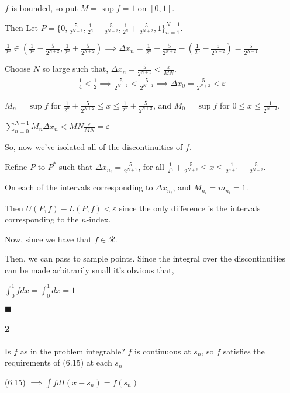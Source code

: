 \documentclass{article}
\begin{document}
$f$ is bounded, so put $M = \sup f = 1$ on $[0,1]$.

Then Let $P = \{0,\frac{5}{2^{N+2}},\frac{1}{2^n}- \frac{5}{2^{N+2}},
\frac{1}{2^n}+ \frac{5}{2^{N+2}}, 1\}_{n=1}^{N-1}$.

$\frac{1}{2^n} \in \left(\frac{1}{2^n}- \frac{5}{2^{N+2}},
\frac{1}{2^n}+ \frac{5}{2^{N+2}}\right) \implies \varDelta x_n =
\frac{1}{2^n}+ \frac{5}{2^{N+2}} -\left(\frac{1}{2^n}-
  \frac{5}{2^{N+2}}\right) = \frac{5}{2^{N+1}}$


Choose $N$ so large such that, $\varDelta x_n = \frac{5}{2^{N+1}} <
\frac{\varepsilon}{MN}$.
\begin{align*}
\frac{1}{4} < \frac{1}{2} \implies \frac{5}{2^{N+2}} <
  \frac{5}{2^{N+1}} \implies \varDelta x_0 = \frac{5}{2^{N+2}} < \varepsilon
\end{align*}

$M_n = \sup f$ for $\frac{1}{2^n}+ \frac{5}{2^{N+2}}\leq x \leq
\frac{1}{2^n}+ \frac{5}{2^{N+2}}$,
and
$M_0 = \sup f$ for $0\leq x \leq \frac{1}{2^{N+2}}$.

$\sum_{n= 0}^{N-1} M_n \varDelta x_n < MN\frac{\varepsilon}{MN} = \varepsilon$

So, now we've isolated all of the discontinuities of $f$.

Refine $P$ to $P^*$ such that $\varDelta x_{n_i} = \frac{5}{2^{N+1}}$, for all
$\frac{1}{2^n} + \frac{5}{2^{N+2}}\leq x \leq \frac{1}{2^{n+1}} -
\frac{5}{2^{N+2}}$.

On each of the intervals corresponding to $\varDelta
x_{n_i}$, and $M_{n_i} = m_{n_i} = 1$.

Then $U(P,f)-L(P,f) <\varepsilon$ since the only difference is the
intervals corresponding to the $n$-index.

Now, since we have that $f\in \mathcal{R}.$

Then, we can pass to sample points. Since the integral over the
discontinuities can be made arbitrarily small it's obvious that,

$\int_0^1 f dx = \int_0^1 dx = 1$

$\blacksquare$

\newpage
\paragraph{2} Is $f$ as in the problem integrable?
$f$ is continuous at $s_n$, so $f$ satisfies the requirements of
(6.15) at each $s_n$

(6.15) $\implies \int f dI(x-s_n) = f(s_n)$
\end{document}
